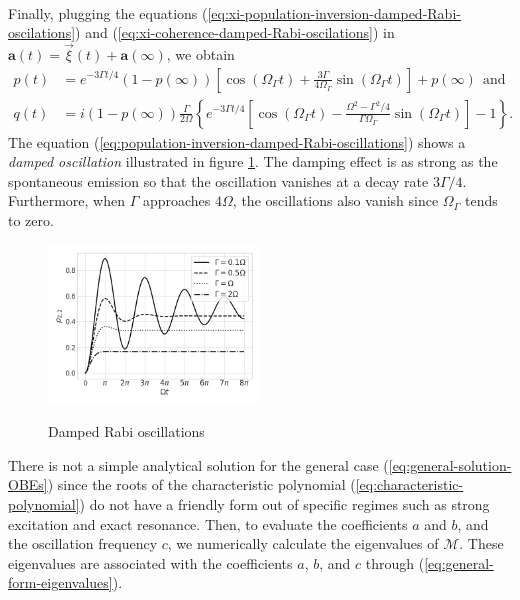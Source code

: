 {\begin{align}
	\label{eq:xi-coherence-damped-Rabi-oscilations}
\end{align}
Finally, plugging the equations (\ref{eq:xi-population-inversion-damped-Rabi-oscilations}) and (\ref{eq:xi-coherence-damped-Rabi-oscilations}) in $ \mathbf{a}(t) = \vec{\xi}(t) + \mathbf{a}(\infty) $, we obtain
\begin{align}
	p(t) &= e^{-3\Gamma t / 4}(1 - p(\infty))\left[\cos(\Omega_{\Gamma}t) + \frac{3\Gamma}{4 \Omega_{\Gamma}} \sin(\Omega_{\Gamma}t) \right] + p(\infty)\ \ \textrm{and}
	\label{eq:population-inversion-damped-Rabi-oscillations}
	\\
	q(t) &= i(1 - p(\infty)) \frac{\Gamma}{2\Omega} \left\{ e^{-3\Gamma t / 4} \left[\cos(\Omega_{\Gamma}t) - \frac{\Omega^2 - \Gamma^2 / 4}{\Gamma \Omega_{\Gamma}} \sin(\Omega_{\Gamma}t) \right] - 1 \right\}.
	\label{eq:coherence-damped-Rabi-oscillations}
\end{align}
The equation (\ref{eq:population-inversion-damped-Rabi-oscillations}) shows a \textit{damped oscillation} illustrated in figure \ref{fig:damped-Rabi-oscillations}. The damping effect is as strong as the spontaneous emission so that the oscillation vanishes at a decay rate $ 3\Gamma/4 $. Furthermore, when $ \Gamma $ approaches $ 4\Omega $, the oscillations also vanish since $ \Omega_{\Gamma} $ tends to zero.

\begin{figure}[!ht]
	\centering
	\caption{Damped Rabi oscillations}
	\vspace{-10pt}
	\includegraphics[width=0.5\textwidth]{USPSC-img/Damped_Rabi_oscillations.png}
	\label{fig:damped-Rabi-oscillations}
	\vspace{-15pt}
\end{figure}

There is not a simple analytical solution for the general case (\ref{eq:general-solution-OBEs}) since the roots of the characteristic polynomial (\ref{eq:characteristic-polynomial}) do not have a friendly form out of specific regimes such as strong excitation and exact resonance. Then, to evaluate the coefficients $ a $ and $ b $, and the oscillation frequency $ c $, we numerically calculate the eigenvalues of $ \mathcal{M} $. These eigenvalues are associated with the coefficients $ a $, $ b $, and $ c $ through (\ref{eq:general-form-eigenvalues}).

}
